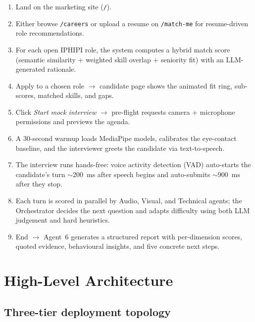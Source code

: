 \documentclass[11pt,a4paper]{article}
\begin{document}
\begin{enumerate}
  \item Land on the marketing site (\texttt{/}).
  \item Either browse \texttt{/careers} or upload a resume on
        \texttt{/match-me} for resume-driven role recommendations.
  \item For each open IPHIPI role, the system computes a hybrid match score
        (semantic similarity + weighted skill overlap + seniority fit) with
        an LLM-generated rationale.
  \item Apply to a chosen role $\rightarrow$ candidate page shows the
        animated fit ring, sub-scores, matched skills, and gaps.
  \item Click \emph{Start mock interview} $\rightarrow$ pre-flight requests
        camera + microphone permissions and previews the agenda.
  \item A 30-second warmup loads MediaPipe models, calibrates the
        eye-contact baseline, and the interviewer greets the candidate via
        text-to-speech.
  \item The interview runs hands-free: voice activity detection (VAD)
        auto-starts the candidate's turn $\sim$200~ms after speech begins
        and auto-submits $\sim$900~ms after they stop.
  \item Each turn is scored in parallel by Audio, Visual, and Technical
        agents; the Orchestrator decides the next question and adapts
        difficulty using both LLM judgement and hard heuristics.
  \item End $\rightarrow$ Agent~6 generates a structured report with
        per-dimension scores, quoted evidence, behavioural insights, and
        five concrete next steps.
\end{enumerate}

\section{High-Level Architecture}\label{sec:arch}

\subsection{Three-tier deployment topology}
\end{document}
